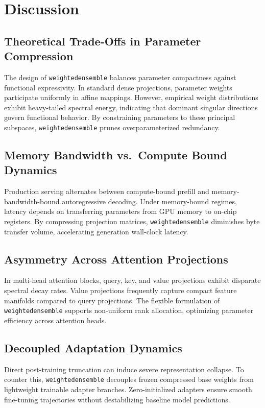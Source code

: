 \section{Discussion}

\subsection{Theoretical Trade-Offs in Parameter Compression}
The design of \texttt{weightedensemble} balances parameter compactness against functional expressivity. In standard dense projections, parameter weights participate uniformly in affine mappings. However, empirical weight distributions exhibit heavy-tailed spectral energy, indicating that dominant singular directions govern functional behavior. By constraining parameters to these principal subspaces, \texttt{weightedensemble} prunes overparameterized redundancy.

\subsection{Memory Bandwidth vs.\ Compute Bound Dynamics}
Production serving alternates between compute-bound prefill and memory-bandwidth-bound autoregressive decoding. Under memory-bound regimes, latency depends on transferring parameters from GPU memory to on-chip registers. By compressing projection matrices, \texttt{weightedensemble} diminishes byte transfer volume, accelerating generation wall-clock latency.

\subsection{Asymmetry Across Attention Projections}
In multi-head attention blocks, query, key, and value projections exhibit disparate spectral decay rates. Value projections frequently capture compact feature manifolds compared to query projections. The flexible formulation of \texttt{weightedensemble} supports non-uniform rank allocation, optimizing parameter efficiency across attention heads.

\subsection{Decoupled Adaptation Dynamics}
Direct post-training truncation can induce severe representation collapse. To counter this, \texttt{weightedensemble} decouples frozen compressed base weights from lightweight trainable adapter branches. Zero-initialized adapters ensure smooth fine-tuning trajectories without destabilizing baseline model predictions.

